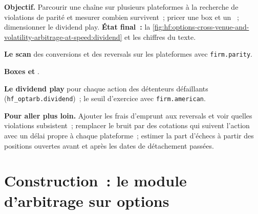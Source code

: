 \begin{tutorial}
\textbf{Objectif.} Parcourir une chaîne sur plusieurs plateformes à la recherche de violations de parité et mesurer combien survivent~; pricer une box et un ~; dimensionner le
dividend play. \textbf{État final~:} la \cref{fig:hf:options-cross-venue-and-volatility-arbitrage-at-speed:dividend} et les chiffres du texte.
\begin{tutsteps}
\item \textbf{Le scan} des conversions et des reversals sur les plateformes avec \texttt{firm.parity}.
\label{lst:hf:options-cross-venue-and-volatility-arbitrage-at-speed:scan}
\item \textbf{Boxes et }.
\label{lst:hf:options-cross-venue-and-volatility-arbitrage-at-speed:box}
\item \textbf{Le dividend play} pour chaque action des détenteurs défaillants (\texttt{hf\_optarb.dividend})~; le seuil d'exercice avec
\texttt{firm.american}.
\end{tutsteps}
\textbf{Pour aller plus loin.} Ajouter les frais d'emprunt aux reversals et voir quelles violations subsistent~; remplacer le bruit par des cotations qui suivent l'action avec un
délai propre à chaque plateforme~; estimer la part d'échecs à partir des positions ouvertes avant et après les dates de détachement passées.
\end{tutorial}

\section{Construction~: le module d'arbitrage sur options}\label{bld:hf:options-cross-venue-and-volatility-arbitrage-at-speed:optarb}


